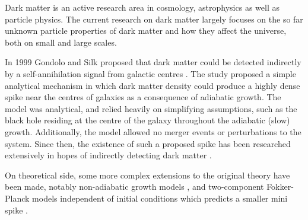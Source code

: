 \documentclass[12pt]{article}
\begin{document}








Dark matter is an active research area in cosmology, astrophysics as well as particle physics. 
The current research on dark matter largely focuses on the so far 
unknown particle properties of dark matter and how they affect the universe, 
both on small and large scales. %

In 1999 Gondolo and Silk proposed that dark matter could be detected 
indirectly by a self-annihilation signal from galactic centres \citep{GS_1999}. %
The study proposed a simple analytical mechanism in which dark matter density could produce a highly dense spike near the centres of galaxies 
as a consequence of adiabatic growth. The model was analytical, and relied heavily on simplifying assumptions, such as the black hole residing 
at the centre of the galaxy throughout the adiabatic (slow) growth. Additionally, 
the model allowed no merger events or perturbations to the system.%
Since then, the existence of such a proposed spike has been researched extensively in hopes of 
indirectly detecting dark matter \citep{gondolo2000dmsearch,bertone2001dmsearch}. %

On theoretical side, some more complex extensions to the original theory have been made, notably non-adiabatic growth models 
\citep{ullio2001spike_criticism}, and two-component Fokker-Planck models independent of initial conditions which predicts a 
smaller mini spike \citep{gnedin_primack_2004}.  %
\end{document}
